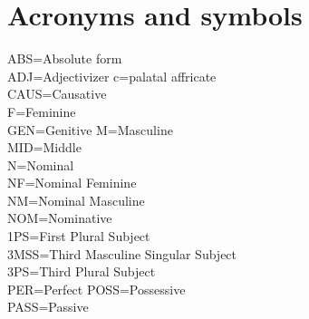 \documentclass[11pt,a4paper]{article}
\begin{document}
\newpage



\newpage
\section*{Acronyms and symbols}
ABS=Absolute form\\
ADJ=Adjectivizer
c=palatal affricate\\
CAUS=Causative\\
F=Feminine\\
GEN=Genitive
M=Masculine\\
MID=Middle\\
N=Nominal\\
NF=Nominal Feminine\\
NM=Nominal Masculine\\
NOM=Nominative\\
1PS=First Plural Subject\\
3MSS=Third Masculine Singular Subject\\
3PS=Third Plural Subject \\
PER=Perfect
POSS=Possessive\\
PASS=Passive\\
\end{document}

